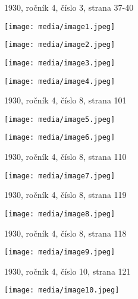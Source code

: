 1930, ročník 4, číslo 3, strana 37-40

\texttt{[image: media/image1.jpeg]}

\texttt{[image: media/image2.jpeg]}

\texttt{[image: media/image3.jpeg]}

\texttt{[image: media/image4.jpeg]}

1930, ročník 4, číslo 8, strana 101

\texttt{[image: media/image5.jpeg]}

\texttt{[image: media/image6.jpeg]}

1930, ročník 4, číslo 8, strana 110

\texttt{[image: media/image7.jpeg]}

1930, ročník 4, číslo 8, strana 119

\texttt{[image: media/image8.jpeg]}

1930, ročník 4, číslo 8, strana 118

\texttt{[image: media/image9.jpeg]}

1930, ročník 4, číslo 10, strana 121

\texttt{[image: media/image10.jpeg]}
